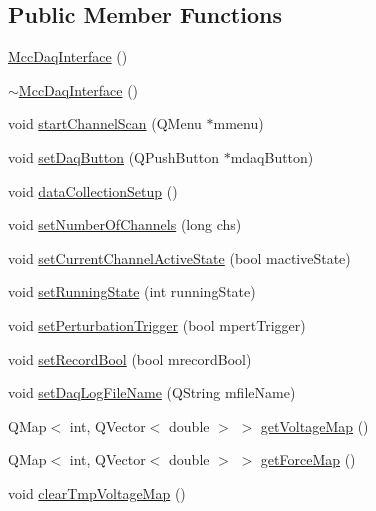 \subsection*{Public Member Functions}
\begin{DoxyCompactItemize}
\item 
\hyperlink{class_mcc_daq_interface_a1dc6d2ded354eec0d0a702a8d4639147}{Mcc\+Daq\+Interface} ()
\item 
\hyperlink{class_mcc_daq_interface_a97a44a3991abe59439a33b47f2636ae1}{$\sim$\+Mcc\+Daq\+Interface} ()
\item 
void \hyperlink{class_mcc_daq_interface_a3036cbabc3a63737a96d0ff1fa9ce449}{start\+Channel\+Scan} (Q\+Menu $\ast$mmenu)
\item 
void \hyperlink{class_mcc_daq_interface_a64c1207013b4a2f6782131017658f527}{set\+Daq\+Button} (Q\+Push\+Button $\ast$mdaq\+Button)
\item 
void \hyperlink{class_mcc_daq_interface_af4fee75cc1637188c98bd7c1ddc745a2}{data\+Collection\+Setup} ()
\item 
void \hyperlink{class_mcc_daq_interface_a82ca01bbe3fcf58de7e4fdfc3d1aa379}{set\+Number\+Of\+Channels} (long chs)
\item 
void \hyperlink{class_mcc_daq_interface_a3024b53b897a0e7778fd5c2df7932999}{set\+Current\+Channel\+Active\+State} (bool mactive\+State)
\item 
void \hyperlink{class_mcc_daq_interface_a05186e503fb77fcecaf0748960d0d659}{set\+Running\+State} (int running\+State)
\item 
void \hyperlink{class_mcc_daq_interface_a02ca77cf28a12bafc03281c9b0792642}{set\+Perturbation\+Trigger} (bool mpert\+Trigger)
\item 
void \hyperlink{class_mcc_daq_interface_ae489ccc434b8f12e01cce99f3acb97bc}{set\+Record\+Bool} (bool mrecord\+Bool)
\item 
void \hyperlink{class_mcc_daq_interface_aac1bb00fead8900d77ea1fc732f8b7b7}{set\+Daq\+Log\+File\+Name} (Q\+String mfile\+Name)
\item 
Q\+Map$<$ int, Q\+Vector$<$ double $>$ $>$ \hyperlink{class_mcc_daq_interface_a2386ad8fa783fdb1dd53e8678ce0e7bb}{get\+Voltage\+Map} ()
\item 
Q\+Map$<$ int, Q\+Vector$<$ double $>$ $>$ \hyperlink{class_mcc_daq_interface_ad2609d22e8a5aa8a365c5fb875e82ada}{get\+Force\+Map} ()
\item 
void \hyperlink{class_mcc_daq_interface_adbcc5a67d3e2aaef7742883bc58e19a7}{clear\+Tmp\+Voltage\+Map} ()
\end{DoxyCompactItemize}
